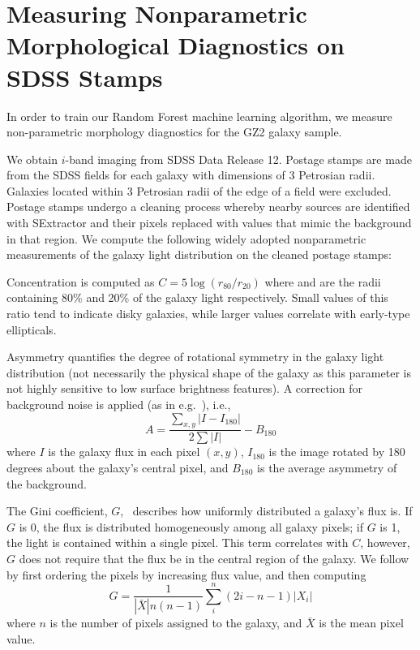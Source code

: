 

\chapter{Measuring Nonparametric Morphological Diagnostics on SDSS Stamps} 
\label{sec: measuring morphology}


In order to train our Random Forest machine learning algorithm, we measure  non-parametric
morphology diagnostics for the GZ2 galaxy sample. 

We obtain $i$-band imaging from SDSS Data Release 12. Postage stamps are made from 
the SDSS fields for each galaxy with dimensions of 3 Petrosian radii. Galaxies located 
within 3 Petrosian radii of the edge of a field were excluded.  Postage stamps undergo a
 cleaning process whereby nearby sources are identified with SExtractor \citep[ver. 2.8.6;][]{sextractor} and their pixels replaced with values that mimic the background in that region. 
We compute the following widely adopted nonparametric measurements  of the galaxy light distribution on the cleaned postage stamps:

Concentration is computed as $C = 5\log(r_{80}/ r_{20})$ where  and  are the
radii containing 80\% and 20\% of the galaxy light respectively.  Small values of this ratio 
tend to indicate disky galaxies, while larger values correlate with early-type ellipticals. 

Asymmetry quantifies the degree of rotational symmetry in the galaxy light distribution
 (not necessarily the physical shape of the galaxy as this parameter is not highly sensitive 
to low surface brightness features). A correction for background noise is applied (as in e.g.~\cite{Conselice2000}), i.e., 
\begin{equation}
A = \frac{\sum_{x,y} |I - I_{180}|}{ 2\sum|I|} - B_{180}
\end{equation}
where $I$ is the galaxy flux in each pixel $(x, y)$, $I_{180}$ is the image rotated by 180 degrees about the galaxy's central pixel, and $B_{180}$ is the average asymmetry of the background. 

The Gini coefficient, $G$,~\citep{Glasser1962, Abraham2003} describes how uniformly distributed a galaxy's flux is.  If $G$ is 0, the flux is distributed homogeneously among all galaxy pixels; if $G$ is 1,  the light is contained within a single pixel. This term correlates with $C$, however, $G$ does not require that the flux be in the central region of the galaxy.  We follow~\cite{Lotz2004} by first ordering the pixels by increasing flux value, and then computing
\begin{equation}
G = \frac{1}{|\bar X|n(n-1)}\sum_i^n(2i-n-1)|X_i|
\end{equation}
where $n$ is the number of pixels assigned to the galaxy, and $\bar X$ is the mean pixel value. 

